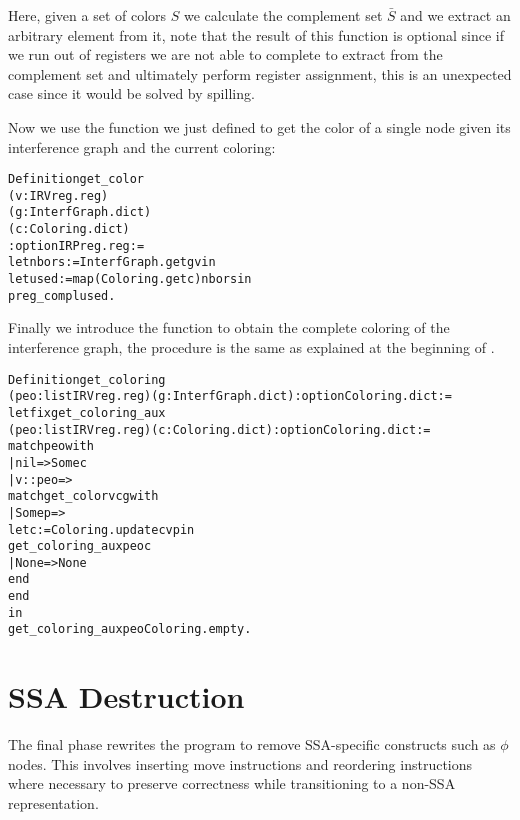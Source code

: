 Here, given a set of colors $S$ we calculate the complement set $\bar S$ and we extract an arbitrary element from it, note that the result of this function is optional since if we run out of registers we are not able to complete to extract from the complement set and ultimately perform register assignment, this is an unexpected case since it would be solved by spilling.

Now we use the function we just defined to get the color of a single node given its interference graph and the current coloring:

\begin{alltt}
Definition get_color
  (v : IRVreg.reg)
  (g : InterfGraph.dict)
  (c : Coloring.dict)
  : option IRPreg.reg :=
  let nbors := InterfGraph.get g v in
  let used := map (Coloring.get c) nbors in
  preg_compl used.
\end{alltt}

Finally we introduce the function to obtain the complete coloring of the interference graph, the procedure is the same as explained at the beginning of .

\begin{alltt}
Definition get_coloring
  (peo : list IRVreg.reg) (g : InterfGraph.dict) : option Coloring.dict :=
  let fix get_coloring_aux
    (peo : list IRVreg.reg) (c : Coloring.dict) : option Coloring.dict :=
    match peo with
    | nil => Some c
    | v :: peo =>
      match get_color v c g with
      | Some p =>
        let c := Coloring.update c v p in
        get_coloring_aux peo c
      | None => None
      end
    end
  in
  get_coloring_aux peo Coloring.empty.
\end{alltt}

\section{SSA Destruction}
\label{sec:destruct}

The final phase rewrites the program to remove SSA-specific constructs such as $\phi$ nodes. This involves inserting move instructions and reordering instructions where necessary to preserve correctness while transitioning to a non-SSA representation.